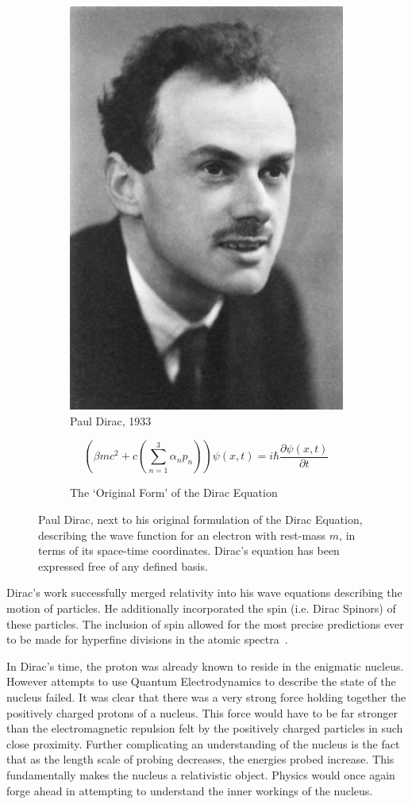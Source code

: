 \begin{figure}[ht]
	\centering
	\begin{subfigure}{.4\textwidth}
		\centering
		\includegraphics[width=0.4\linewidth]{./figures/pauldirac.jpg}
		\caption{Paul Dirac, 1933  \cite{NobelFoundation1933}}
		\label{fig:pauldirac}
	\end{subfigure}%
	\begin{subfigure}{0.6\textwidth}
		\centering
		\begin{equation}
			\left(\beta mc^2 + c\left(\sum_{n \mathop =1}^{3}\alpha_n p_n\right)\right) \psi (x,t) = i \hbar \frac{\partial\psi(x,t) }{\partial t}
		\end{equation}
		\caption{The `Original Form' of the Dirac Equation}
		\label{eq:diracquation}
	\end{subfigure}
	\caption{ 
		Paul Dirac, next to his original formulation of the Dirac Equation,
		describing the wave function for an electron with rest-mass $m$, in terms of
		its space-time coordinates. Dirac's equation has been expressed free of any
    defined basis.
	}
	\label{fig:thomsonrays}
\end{figure}

Dirac's work successfully merged relativity into his wave equations describing
the motion of particles. He additionally incorporated the spin (i.e. Dirac
Spinors) of these particles. The inclusion of spin allowed for the most precise
predictions ever to be made for hyperfine divisions in the atomic
spectra~\cite{Dirac}.

In Dirac's time, the proton was already known to reside in the enigmatic
nucleus. However attempts to use Quantum Electrodynamics to describe the state
of the nucleus failed. It was clear that there was a very strong force holding
together the positively charged protons of a nucleus. This force would have to
be far stronger than the electromagnetic repulsion felt by the positively
charged particles in such close proximity. Further complicating an understanding
of the nucleus is the fact that as the length scale of probing decreases, the
energies probed increase. This fundamentally makes the nucleus a relativistic
object. Physics would once again forge ahead in attempting to understand the
inner workings of the nucleus.

